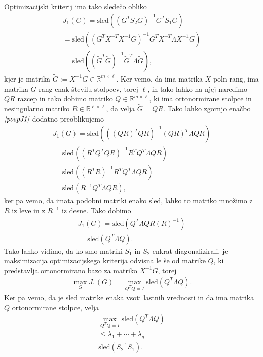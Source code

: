 \documentclass[mat1]{article}
\begin{document}
Optimizacijski kriterij ima tako sledečo obliko
\begin{equation} \label{pospJ1}
\begin{split}
J_1\left(G\right)
=
\text{sled} \left( (G^T S_2 G)^{-1} G^T S_1 G \right)
\\
=
\text{sled} \left( (G^T X^{-T}X^{-1} G)^{-1} G^T X^{-T} \Lambda X^{-1} G \right)
\\
= 
\text{sled} \left( (\tilde{G}^T \tilde{G})^{-1} \tilde{G}^T \Lambda \tilde{G} \right)
\text{,}
\end{split}
\end{equation}
kjer je matrika $\tilde{G} := X^{-1} G \in \mathbb{R}^{m \times \ell}$. Ker vemo, da ima matrika $X$ poln rang, ima matrika $\tilde{G}$ rang enak številu stolpcev, torej $\ell$, in tako lahko na njej naredimo $QR$ razcep in tako dobimo matriko $Q \in \mathbb{R}^{m \times \ell}$, ki ima ortonormirane stolpce in nesingularno matriko $R \in \mathbb{R}^{\ell \times \ell}$, da velja $\tilde{G} = QR$. Tako lahko zgornjo enačbo $\textit{\eqref{pospJ1}}$ dodatno preoblikujemo
\begin{align*}
J_1(G)
=
\text{sled} \left( ((QR)^T QR)^{-1} (QR)^T \Lambda QR \right)
\\
=
\text{sled} \left( (R^T Q^T QR)^{-1} R^T Q^T \Lambda QR \right)
\\
=
\text{sled} \left( (R^T R)^{-1} R^T Q^T \Lambda QR \right)
\\
=
\text{sled} \left( R^{-1} Q^T \Lambda QR \right)
\text{,}
\end{align*}
ker pa vemo, da imata podobni matriki enako sled, lahko to matriko množimo z $R$ iz leve in z $R^{-1}$ iz desne. Tako dobimo
\begin{align*}
J_1(G)
=
\text{sled} \left(Q^T \Lambda QR  (R)^{-1} \right)
\\
=
\text{sled} \left(Q^T \Lambda Q \right)
\text{.}
\end{align*}
Tako lahko vidimo, da ko smo matriki $S_1$ in $S_2$ enkrat diagonalizirali, je maksimizacija optimizacijskega kriterija odvisna le še od matrike $Q$, ki predstavlja ortonormirano bazo za matriko $X^{-1} G$, torej
\begin{align*}
\max_G J_1(G) = \max_{Q^TQ=I} \text{sled} \left(Q^T \Lambda Q \right)
\text{.}
\end{align*}
Ker pa vemo, da je sled matrike enaka vsoti lastnih vrednosti in da ima matrika $Q$ ortonormirane stolpce, velja
\begin{align*}
\max_{Q^TQ=I} \text{sled} \left(Q^T \Lambda Q \right)
\\
\leq
\lambda_1 + \cdots + \lambda_q
\\
\text{sled} \left( S_2^{-1} S_1 \right)
\text{.}
\end{align*}
\end{document}
